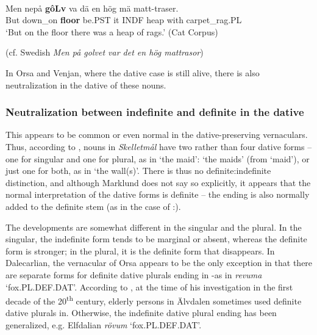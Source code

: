 
\ea\label{}
\\
\gll	Men  nepå  \textbf{gôLv} va  dä  en  hög  mä  matt-traser.\\
		But  down\_on  \textbf{floor} be.PST  it  INDF  heap  with  carpet\_rag.PL\\
\glt	‘But on the floor there was a heap of rags.’ (Cat Corpus)

\z

(cf. Swedish \textit{Men på golvet var det en hög mattrasor})


In Orsa and Venjan, where the dative case is still alive, there is also neutralization in the dative of these nouns. 

\subsubsection{Neutralization between indefinite and definite in the dative}
 This appears to be common or even normal in the dative-preserving vernaculars. Thus, according to \citet{Marklund1976}, nouns in \textit{Skelletmål} have two rather than four dative forms – one for singular and one for plural, as in  ‘the maid’:  ‘the maids’ (from  ‘maid’), or just one for both, as in ‘the wall(s)’. There is thus no definite:indefinite distinction, and although Marklund does not say so explicitly, it appears that the normal interpretation of the dative forms is definite – the ending is also normally added to the definite stem (as in the case of :).

The developments are somewhat different in the singular and the plural. In the singular, the indefinite form tends to be marginal or absent, whereas the definite form is stronger; in the plural, it is the definite form that disappears. In Dalecarlian,  the vernacular of Orsa appears to be the only exception in that there are separate forms for definite dative plurals ending in \nobreakdash-as in \textit{revuma} ‘fox.PL.DEF.DAT’. According to \citet{Levander1909}, at the time of his investigation in the first decade of the 20\textsuperscript{th} century, elderly persons in Älvdalen sometimes used definite dative plurals in\textstyleLinguisticExample{ }.  Otherwise, the indefinite dative plural ending  has been generalized, e.g. Elfdalian \textit{rövum} ‘fox.PL.DEF.DAT’.

